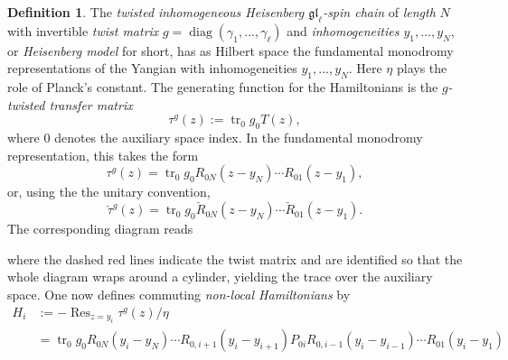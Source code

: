 \documentclass[11pt]{report}
\theoremstyle{definition}
\newtheorem{definition}[theorem]{Definition}
\theoremstyle{remark}
\theoremstyle{remark}
\begin{document}
\begin{definition}
The \emph{twisted inhomogeneous Heisenberg $\mathfrak{gl}_\ell$-spin chain} of \emph{length} $N$ with invertible \emph{twist matrix} $g = \operatorname{diag}(\gamma_1,...,\gamma_\ell)$ and \emph{inhomogeneities $y_1,...,y_N$}, or \emph{Heisenberg model} for short, has as Hilbert space the fundamental monodromy representations of the Yangian with inhomogeneities $y_1,...,y_N$. Here $\eta$ plays the role of Planck's constant. The generating function for the Hamiltonians is the \emph{$g$-twisted transfer matrix}
\begin{equation*}
\tau^g(z) := \operatorname{tr}_0 g_0 T(z),
\end{equation*}
where $0$ denotes the auxiliary space index. In the fundamental monodromy representation, this takes the form
\begin{equation*}
\tau^g(z) = \operatorname{tr}_0 g_0 R_{0N}(z-y_N) \cdots R_{01}(z-y_1),
\end{equation*}
or, using the the unitary convention,
\begin{equation*}
\check \tau^g(z) = \operatorname{tr}_0 g_0 \check R_{0N}(z-y_N) \cdots \check R_{01}(z-y_1).
\end{equation*}
The corresponding diagram reads
~\\
\begin{center}
\end{center}
where the dashed red lines indicate the twist matrix and are identified so that the whole diagram wraps around a cylinder, yielding the trace over the auxiliary space. One now defines commuting \emph{non-local Hamiltonians} by
\begin{align*}
H_i 
&:= -\operatorname{Res}_{z=y_i} \tau^g(z)/\eta \\
&= \operatorname{tr}_0 g_0 R_{0N}(y_i-y_N) \cdots R_{0,i+1}(y_i-y_{i+1}) P_{0i} R_{0,i-1}(y_i-y_{i-1}) \cdots R_{01}(y_i-y_1) \\

\end{align*}
\end{definition}
\end{document}

